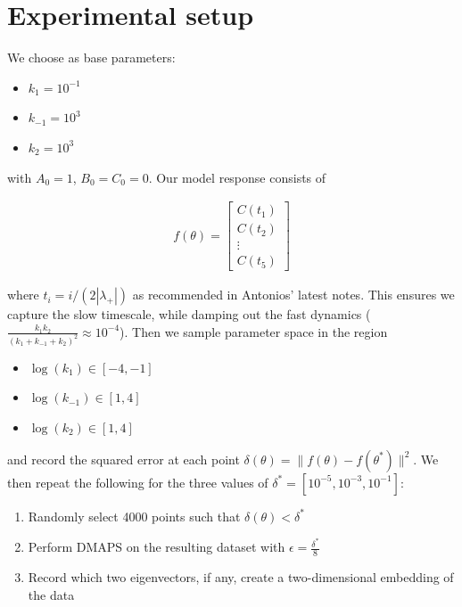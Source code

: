\documentclass[11pt]{article}
\begin{document}
\clearpage
\section{Experimental setup}

We choose as base parameters:

\begin{itemize}
  \item $k_1 = 10^{-1}$
  \item $k_{-1} = 10^3$
  \item $k_2 = 10^3$
\end{itemize}

with $A_0 = 1$, $B_0 = C_0 = 0$. Our model response consists of

\begin{align*}
  f(\theta) = \begin{bmatrix} C(t_1) \\ C(t_2) \\ \vdots \\
    C(t_5) \end{bmatrix}
\end{align*}

where $t_i = i/(2 | \lambda_+ |)$ as recommended in Antonios' latest
notes. This ensures we capture the slow timescale, while damping out
the fast dynamics ($\frac{k_1 k_2}{(k_1 + k_{-1} + k_2)^2} \approx
10^{-4}$). Then we sample parameter space in the region

\begin{itemize}
  \item $\log(k_1) \in [-4, -1]$
  \item $\log(k_{-1}) \in [1, 4]$
  \item $\log(k_2) \in [1, 4]$
\end{itemize}

and record the squared error at each point $\delta(\theta) = \|
f(\theta) - f(\theta^*) \|^2$. We then repeat the following for the
three values of $\delta^* = [10^{-5}, 10^{-3}, 10^{-1}]$:

\begin{enumerate}
  \item Randomly select 4000 points such that $\delta(\theta) <
    \delta^*$
  \item Perform DMAPS on the resulting dataset with $\epsilon =
    \frac{\delta^*}{8}$
  \item Record which two eigenvectors, if any, create a
    two-dimensional embedding of the data
\end{enumerate}
\end{document}
